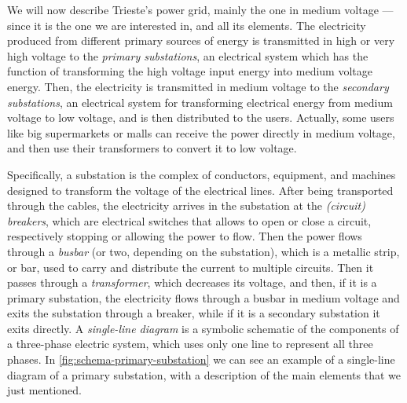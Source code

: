We will now describe Trieste's power grid, mainly the one in medium voltage --- since it is the one we are interested in, and all its elements.  The electricity produced from different primary sources of energy is transmitted in high or very high voltage to the \emph{primary substations}, an electrical system which has the function of transforming the high voltage input energy into medium voltage energy. Then, the electricity is transmitted in medium voltage to the \emph{secondary substations}, an electrical system for transforming electrical energy from medium voltage to low voltage, and is then distributed to the users. Actually, some users like big supermarkets or malls can receive the power directly in medium voltage, and then use their transformers to convert it to low voltage.

Specifically, a substation is the complex of conductors, equipment, and machines designed to transform the voltage of the electrical lines. After being transported through the cables, the electricity arrives in the substation at the \emph{(circuit) breakers}, which are electrical switches that allows to open or close a circuit, respectively stopping or allowing the power to flow. Then the power flows through a \emph{busbar} (or two, depending on the substation), which is a metallic strip, or bar, used to carry and distribute the current to multiple circuits. Then it passes through a \emph{transformer}, which decreases its voltage, and then, if it is a primary substation, the electricity flows through a busbar in medium voltage and exits the substation through a breaker, while if it is a secondary substation it exits directly. A \emph{single-line diagram} is a symbolic schematic of the components of a three-phase electric system, which uses only one line to represent all three phases. In \autoref{fig:schema-primary-substation} we can see an example of a single-line diagram of a primary substation, with a description of the main elements that we just mentioned.

